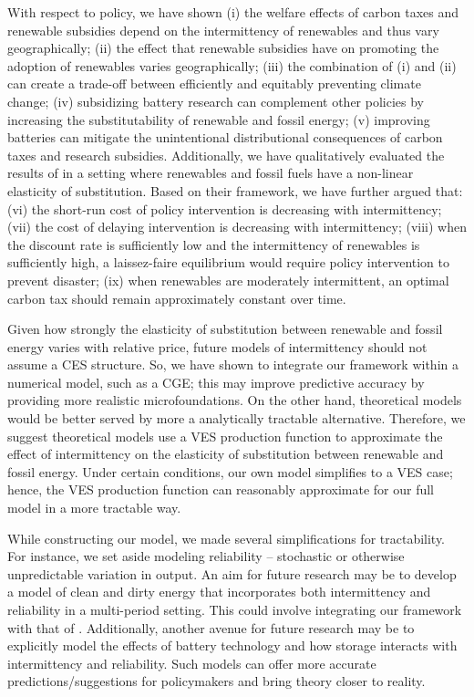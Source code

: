 \documentclass[11pt,a4paper,leqno]{extarticle}
\begin{document}
	With respect to policy, we have shown (i) the welfare effects of carbon taxes and renewable subsidies depend on the intermittency of renewables and thus vary geographically; (ii) the effect that renewable subsidies have on promoting the adoption of renewables varies geographically; (iii) the combination of (i) and (ii) can create a trade-off between efficiently and equitably preventing climate change; (iv) subsidizing battery research can complement other policies by increasing the substitutability of renewable and fossil energy; (v) improving batteries can mitigate the unintentional distributional consequences of carbon taxes and research subsidies.  Additionally, we have qualitatively evaluated the results of \citet{Ace2012} in a setting where renewables and fossil fuels have a non-linear elasticity of substitution. Based on their framework, we have further argued that: (vi) the short-run cost of policy intervention is decreasing with intermittency;  (vii) the cost of delaying intervention is decreasing with intermittency; (viii) when the discount rate is sufficiently low and the intermittency of renewables is sufficiently high, a laissez-faire equilibrium would require policy intervention to prevent disaster; (ix) when renewables are moderately intermittent, an optimal carbon tax should remain approximately constant over time. 
	
	Given how strongly the elasticity of substitution between renewable and fossil energy varies with relative price, future models of intermittency should not assume a CES structure. So, we have shown to integrate our framework within a numerical model, such as a CGE; this may improve predictive accuracy by providing more realistic microfoundations. On the other hand, theoretical models would be better served by more a analytically tractable alternative. Therefore, we suggest theoretical models use a VES production function to approximate the effect of intermittency on the elasticity of substitution between renewable and fossil energy. Under certain conditions, our own model simplifies to a VES case; hence, the VES production function can reasonably approximate for our full model in a more tractable way. 
	
	While constructing our model, we made several simplifications for tractability. For instance, we set aside modeling reliability -- stochastic or otherwise unpredictable variation in output. An aim for future research may be to develop a model of clean and dirty energy that incorporates both intermittency and reliability in a multi-period setting. This could involve integrating our framework with that of \citet{HH}. Additionally, another avenue for future research may be to explicitly model the effects of battery technology and how storage interacts with intermittency and reliability. Such models can offer more accurate predictions/suggestions for policymakers and bring theory closer to reality.
	
\end{document}
